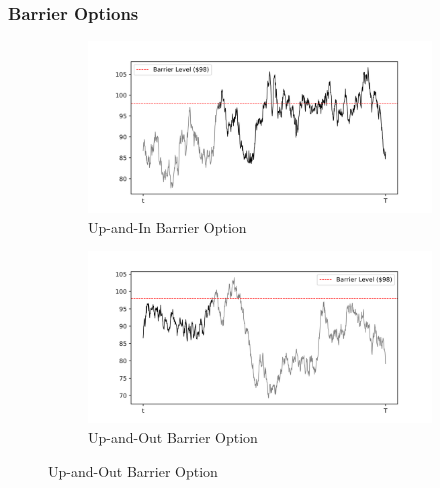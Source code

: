 \documentclass[a4paper]{report}
\begin{document}
\subsubsection{Barrier Options}
\begin{figure}[H]
    \begin{subfigure}{.5\linewidth}
      \includegraphics[width=\linewidth]{images/up_in_option.png}
      \caption{Up-and-In Barrier Option}
    \end{subfigure}\hfill
    \begin{subfigure}{.5\linewidth}
      \includegraphics[width=\linewidth]{images/up_out_option.png}
      \caption{Up-and-Out Barrier Option}
    \end{subfigure}
    

\end{figure}
\end{document}
